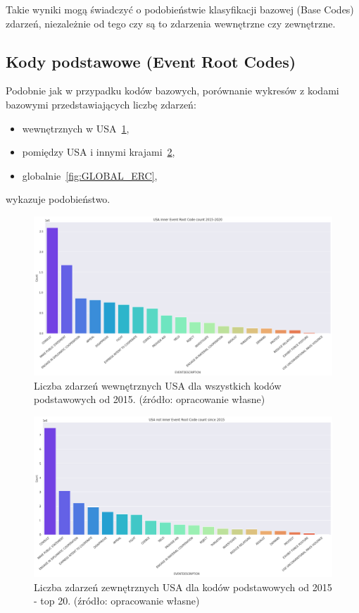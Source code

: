 \documentclass[11pt]{report}
\begin{document}
    Takie wyniki mogą świadczyć o podobieństwie klasyfikacji bazowej (Base Codes) zdarzeń,
    niezależnie od tego czy są to zdarzenia wewnętrzne czy zewnętrzne.

    \subsection{Kody podstawowe (Event Root Codes)}\label{subsec:kody-podstawowenullevent-root-codesnull}

    Podobnie jak w przypadku kodów bazowych, porównanie wykresów z kodami bazowymi przedstawiających liczbę zdarzeń:
    \begin{itemize}
        \item wewnętrznych w USA~\ref{fig:USA_inner_ERC},
        \item pomiędzy USA i innymi krajami~\ref{fig:USA_not_inner_ERC},
        \item globalnie~\ref{fig:GLOBAL_ERC},
    \end{itemize}
    wykazuje podobieństwo.

    \begin{figure}[!htp]
        \centering
        \includegraphics[width=\linewidth]{fig/USA inner/ERC.png}
        \caption{Liczba zdarzeń wewnętrznych USA dla wszystkich kodów podstawowych od 2015. (źródło: opracowanie własne)}
        \label{fig:USA_inner_ERC}
    \end{figure}

    \begin{figure}[!htp]
        \centering
        \includegraphics[width=\linewidth]{fig/USA not inner/ERC.png}
        \caption{Liczba zdarzeń zewnętrznych USA dla kodów podstawowych od 2015 - top 20. (źródło: opracowanie własne)}
        \label{fig:USA_not_inner_ERC}
    \end{figure}
\end{document}
